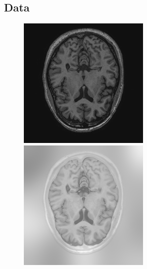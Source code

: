 \documentclass[runningheads,a4paper]{llncs}
\begin{document}
\subsection{Data}
\begin{figure}
 \centering
 \begin{minipage}{.24\textwidth}
 \includegraphics[width=.99\linewidth]{./images/t1.png}
 \end{minipage}
  \begin{minipage}{.24\textwidth}
 \includegraphics[width=.99\linewidth]{./images/t1-ir.png}

\end{minipage}
\end{figure}
\end{document}
